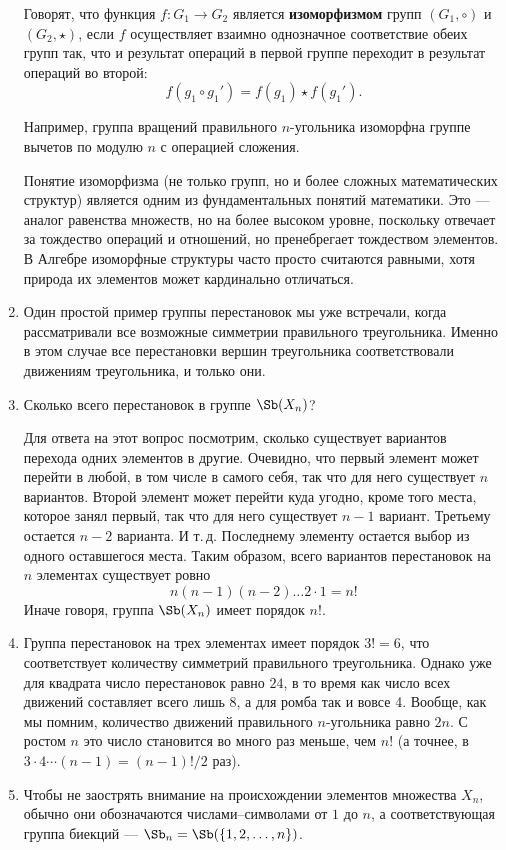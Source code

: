 \begin{enumerate}
Говорят, что функция $f:G_1\to G_2$ является \textbf{изоморфизмом} групп $(G_1,\circ)$ и $(G_2,\star)$, если $f$ осуществляет взаимно однозначное соответствие обеих групп так, что и результат операций в первой группе переходит в результат операций во второй:
$$
f(g_1\circ g_1') = f(g_1)\star f(g_1').
$$

Например, группа вращений правильного $n$-угольника изоморфна группе вычетов по модулю $n$ с операцией сложения.

Понятие изоморфизма (не только групп, но и более сложных математических структур) является одним из фундаментальных понятий математики. Это --- аналог равенства множеств, но на более высоком уровне, поскольку отвечает за тождество операций и отношений, но пренебрегает тождеством элементов. В Алгебре изоморфные структуры часто просто считаются равными, хотя природа их элементов может кардинально отличаться.

\item Один простой пример группы перестановок мы уже встречали, когда рассматривали все возможные симметрии правильного треугольника. Именно в этом случае все перестановки вершин треугольника соответствовали движениям треугольника, и только они.
\item Сколько всего перестановок в группе $\Sb(X_n)$?

Для ответа на этот вопрос посмотрим, сколько существует вариантов перехода одних элементов в другие. Очевидно, что первый элемент может перейти в любой, в том числе в самого себя, так что для него существует $n$ вариантов. Второй элемент может перейти куда угодно, кроме того места, которое занял первый, так что для него существует $n-1$ вариант. Третьему остается $n-2$ варианта. И т.\,д. Последнему элементу остается выбор из одного оставшегося места. Таким образом, всего вариантов перестановок на $n$ элементах существует ровно
$$
n(n-1)(n-2)\dots 2\cdot 1=n!
$$
Иначе говоря, группа $\Sb(X_n)$ имеет порядок $n!$.

\item Группа перестановок на трех элементах имеет порядок $3!=6$, что соответствует количеству симметрий правильного треугольника.
Однако уже для квадрата число перестановок равно $24$, в то время как число всех движений составляет всего лишь 8, а для ромба так и вовсе 4. Вообще, как мы помним, количество движений правильного $n$-угольника равно $2n$. С ростом $n$ это число становится во много раз меньше, чем $n!$ (а точнее, в $3\cdot 4\cdots (n-1)=(n-1)!/2$ раз).
\item Чтобы не заострять внимание на происхождении элементов множества $X_n$, обычно они обозначаются числами--символами от $1$ до $n$, а соответствующая группа биекций --- $\Sb_n=\Sb(\{1,2,\dots,n\})$. 


\end{enumerate}
